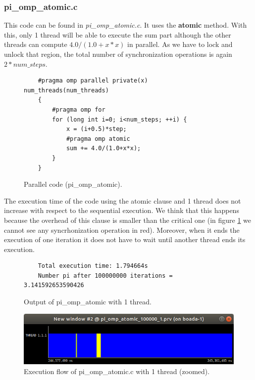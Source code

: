 \documentclass[12pt, a4paper]{article}
\begin{document}
\subsubsection{pi\_omp\_atomic.c}

This code can be found in \textit{pi\_omp\_atomic.c}. It uses the \textbf{atomic} method. With this, only 1 thread will be able to execute the sum part although the other threads can compute $4.0/(1.0+x*x)$ in parallel. As we have to lock and unlock that region, the total number of synchronization operations is again $2 * num\_steps$.

\begin{figure}[H]
	\begin{lstlisting}
	#pragma omp parallel private(x) num_threads(num_threads)
    {
        #pragma omp for 
        for (long int i=0; i<num_steps; ++i) {
            x = (i+0.5)*step;
            #pragma omp atomic 
	    	sum += 4.0/(1.0+x*x);
        }
    }
	\end{lstlisting}
	
	\caption{Parallel code (pi\_omp\_atomic).}
\end{figure}

The execution time of the code using the atomic clause and 1 thread does not increase with respect to the sequential execution. We think that this happens because the overhead of this clause is smaller than the critical one (in figure \ref{pi_omp_atomic_1_zoom} we cannot see any syncrhonization operation in red). Moreover, when it ends the execution of one iteration it does not have to wait until another thread ends its execution.

\begin{figure}[H]
	\begin{lstlisting}
	Total execution time: 1.794664s
	Number pi after 100000000 iterations = 3.141592653590426		
	\end{lstlisting}
	\caption{Output of pi\_omp\_atomic with 1 thread.}
\end{figure}

\begin{figure}[H]
  \centering
  \includegraphics[scale=0.5]{./images/pi_omp_atomic_1_zoom}
  \caption{Execution flow of pi\_omp\_atomic.c with 1 thread (zoomed).}
  \label{pi_omp_atomic_1_zoom}
\end{figure}
\end{document}
